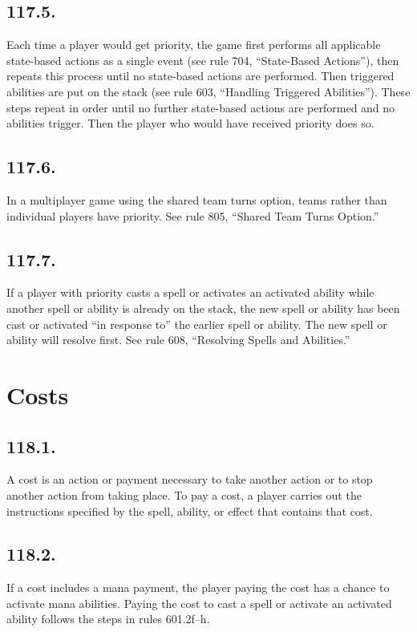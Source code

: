 \subsection*{117.5.}
Each time a player would get priority, the game first performs all applicable state-based actions as a single event (see rule 704, “State-Based Actions”), then repeats this process until no state-based actions are performed. Then triggered abilities are put on the stack (see rule 603, “Handling Triggered Abilities”). These steps repeat in order until no further state-based actions are performed and no abilities trigger. Then the player who would have received priority does so.

\subsection*{117.6.}
In a multiplayer game using the shared team turns option, teams rather than individual players have priority. See rule 805, “Shared Team Turns Option.”

\subsection*{117.7.}
If a player with priority casts a spell or activates an activated ability while another spell or ability is already on the stack, the new spell or ability has been cast or activated “in response to” the earlier spell or ability. The new spell or ability will resolve first. See rule 608, “Resolving Spells and Abilities.”

\section{Costs}
\subsection*{118.1.}
A cost is an action or payment necessary to take another action or to stop another action from taking place. To pay a cost, a player carries out the instructions specified by the spell, ability, or effect that contains that cost.

\subsection*{118.2.}
If a cost includes a mana payment, the player paying the cost has a chance to activate mana abilities. Paying the cost to cast a spell or activate an activated ability follows the steps in rules 601.2f–h.

